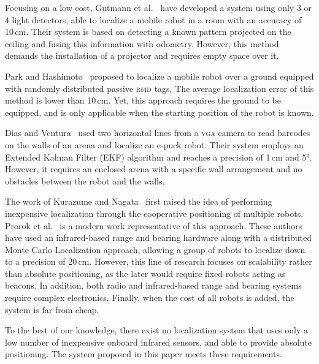 \documentclass{svmult}
\begin{document}
Focusing on a low cost, Gutmann et al.~\cite{gutmann2013challenges} have developed a system using only 3 or 4 light detectors, able to localize a mobile robot in a room with an accuracy of 10\,cm.
Their system is based on detecting a known pattern projected on the ceiling and fusing this information with odometry.
However, this method demands the installation of a projector and requires empty space over it.

Park and Hashimoto~\cite{park2009approach} proposed to localize a mobile robot over a ground equipped with randomly distributed passive \textsc{rfid} tags.
The average localization error of this method is lower than 10\,cm.
Yet, this approach requires the ground to be equipped, and is only applicable when the starting position of the robot is known.

Dias and Ventura~\cite{dias2013absolute} used two horizontal lines from a \textsc{vga} camera to read barcodes on the walls of an arena and localize an e-puck robot.
Their system employs an Extended Kalman Filter (EKF) algorithm and reaches a precision of 1\,cm and 5°.
However, it requires an enclosed arena with a specific wall arrangement and no obstacles between the robot and the walls.

The work of Kurazume and Nagata~\cite{kurazume1994cooperative} first raised the idea of performing inexpensive localization through the cooperative positioning of multiple robots.
Prorok et al.~\cite{prorok2012low} is a modern work representative of this approach.
These authors have used an infrared-based range and bearing hardware along with a distributed Monte Carlo Localization approach, allowing a group of robots to localize down to a precision of 20\,cm.
However, this line of research focuses on scalability rather than absolute positioning, as the later would require fixed robots acting as beacons.
In addition, both radio and infrared-based range and bearing systems require complex electronics.
Finally, when the cost of all robots is added, the system is far from cheap.

To the best of our knowledge, there exist no localization system that uses only a low number of inexpensive onboard infrared sensors, and able to provide absolute positioning.
The system proposed in this paper meets these requirements.
\end{document}
